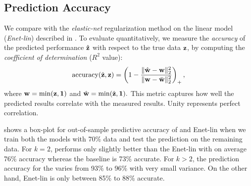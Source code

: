 \subsection{\SYSTEM{} Prediction Accuracy}
\label{sec:st_model}

We compare \SYSTEM{} with the \textit{elastic-net} regularization
method on the linear model (\textit{Enet-lin}) described in
.   To evaluate
quantitatively, we measure the \emph{accuracy} of the predicted
performance $\hat{\mathbf{z}}$ with respect to the true data $\mathbf{z}$, by
computing the \emph{coefficient of determination} ($R^2$ value):
\begin{equation}
\label{eq:accuracy}
\text{accuracy}(\hat{\mathbf{z}},\mathbf{z}) = \left(1 - \frac{\| \hat{\mathbf{w}}-\mathbf{w} \|^2_2}{\| \mathbf{w} - \bar{\mathbf{w}}\|^2_2}\right)_{+},
\end{equation}
where $\mathbf{w} = \min(\mathbf{z},\boldsymbol{1})$ and $\hat{\mathbf{w}} =
\min(\hat{\mathbf{z}},\boldsymbol{1}).$ This metric captures how well the
predicted results correlate with the measured results. Unity
represents perfect correlation.



 shows a box-plot for out-of-sample
predictive accuracy of \SYSTEM{} and Enet-lin when we train both the
models with 70\% data and test the prediction on the remaining data.
For $k=2$, \SYSTEM{} performs only slightly better than the Enet-lin
with on average 76\% accuracy whereas the baseline is 73\% accurate.
For $k>2$, the prediction accuracy for the \SYSTEM{} varies from 93\%
to 96\% with very small variance. On the other hand, Enet-lin is only
between 85\% to 88\% accurate.


